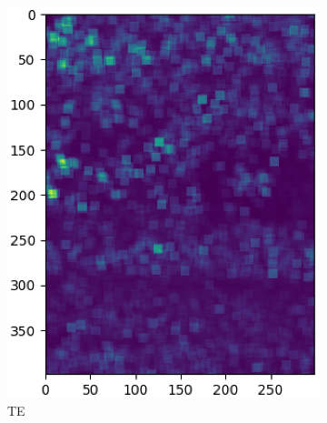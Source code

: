\documentclass{article}
\begin{document}
\begin{figure}[!h]
\begin{subfigure}{.2\textwidth}
    \includegraphics[width=\textwidth]{Bilder/MSE_Bilder/cropped/kernel10_tent_256_0.007_m64_G.eps}
    \caption{TE}
    \label{MSE256TE}
  \end{subfigure}\hfil
  \begin{subfigure}{.2\textwidth}

\end{subfigure}
\end{figure}
\end{document}
